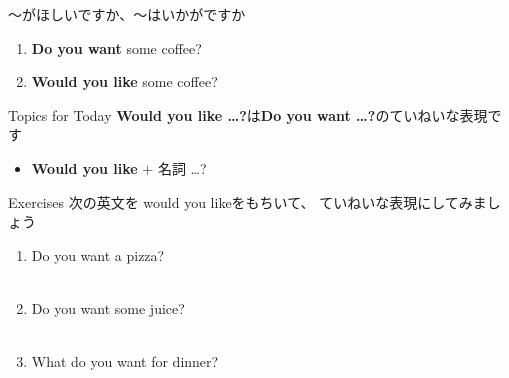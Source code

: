 \documentclass[aspectratio=169,xcolor={dvipsnames,table}]{beamer}
\begin{document}
\begin{frame}[plain]{～がほしいですか、～はいかがですか}
\large
 \begin{enumerate}
  \item \textbf{Do you want} some coffee?
  \item \textbf{Would you like} some coffee? 
 \end{enumerate}

\begin{block}{Topics for Today}\small
\textbf{Would you like \ldots ?}は\textbf{Do you want \ldots ?}のていねいな表現です
\begin{itemize}[square]\small
 \item \textbf{Would you like} $+$ 名詞 \ldots ?
       \end{itemize}
\end{block}
\hfill{\scriptsize {}}

\end{frame}
\begin{frame}[plain]{Exercises}
次の英文を would you likeをもちいて、 ていねいな表現にしてみましょう
 \begin{enumerate}
  \item Do you want a pizza?\\
\\
  \item Do you want some juice?\\
\\
  \item What do you want for dinner?\\
\\
 \end{enumerate}

\hfill{\scriptsize {}}

\end{frame}
\end{document}
